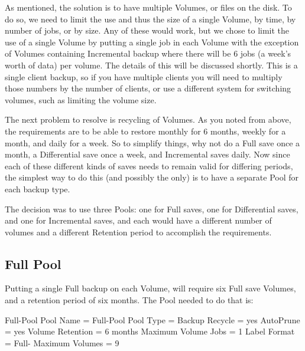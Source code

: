 As mentioned, the solution is to have multiple Volumes, or files on the disk.
To do so, we need to limit the use and thus the size of a single Volume, by
time, by number of jobs, or by size. Any of these would work, but we chose to
limit the use of a single Volume by putting a single job in each Volume with
the exception of Volumes containing Incremental backup where there will be 6
jobs (a week's worth of data) per volume. The details of this will be
discussed shortly.  This is a single client backup, so if you have multiple
clients you will need to multiply those numbers by the number of clients,
or use a different system for switching volumes, such as limiting the
volume size.


The next problem to resolve is recycling of Volumes. As you noted from above,
the requirements are to be able to restore monthly for 6 months, weekly for a
month, and daily for a week. So to simplify things, why not do a Full save
once a month, a Differential save once a week, and Incremental saves daily.
Now since each of these different kinds of saves needs to remain valid for
differing periods, the simplest way to do this (and possibly the only) is to
have a separate Pool for each backup type.

The decision was to use three Pools: one for Full saves, one for Differential
saves, and one for Incremental saves, and each would have a different number
of volumes and a different Retention period to accomplish the requirements.

\label{FullPool}
\subsection{Full Pool}

Putting a single Full backup on each Volume, will require six Full save
Volumes, and a retention period of six months. The Pool needed to do that is:

\begin{bconfig}{Full-Pool}
Pool {
  Name = Full-Pool
  Pool Type = Backup
  Recycle = yes
  AutoPrune = yes
  Volume Retention = 6 months
  Maximum Volume Jobs = 1
  Label Format = Full-
  Maximum Volumes = 9
}
\end{bconfig}

